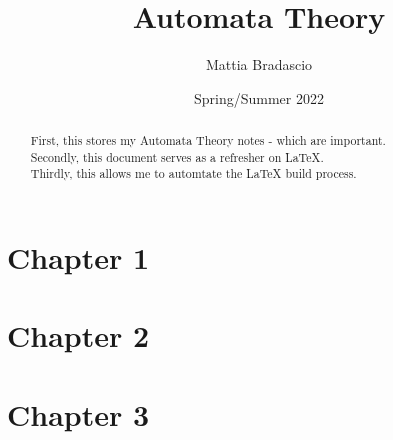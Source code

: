 \documentclass[12pt, letterpaper]{article}
\title{Automata Theory}
\author{Mattia Bradascio}
\date{Spring/Summer 2022}
\begin{document}
\begin{titlepage}
\maketitle
\end{titlepage}

\begin{abstract}

    First, this stores my Automata Theory notes - which are important. \\
    \indent Secondly, this document serves as a refresher on LaTeX. \\
    \indent Thirdly, this allows me to automtate the LaTeX build process. \\

\end{abstract}

\section{Chapter 1}


\section{Chapter 2}


\section{Chapter 3}

\end{document}
